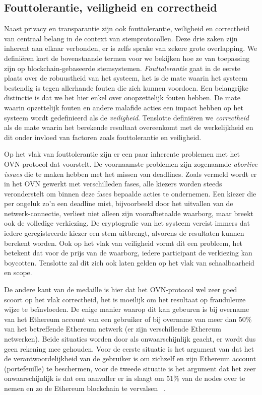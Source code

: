 	\subsection{Fouttolerantie, veiligheid en correctheid}
	
	Naast privacy en transparantie zijn ook fouttolerantie, veiligheid en correctheid van centraal belang in de context van stemprotocollen. Deze drie zaken zijn inherent aan elkaar verbonden, er is zelfs sprake van zekere grote overlapping. We definiëren kort de bovenstaande termen voor we bekijken hoe ze van toepassing zijn op blockchain-gebaseerde stemsystemen. \textit{Fouttolerantie} gaat in de eerste plaats over de robuustheid  van het systeem, het is de mate waarin het systeem bestendig is tegen allerhande fouten die zich kunnen voordoen. Een belangrijke distinctie is dat we het hier enkel over onopzettelijk fouten hebben. De mate waarin opzettelijk fouten en andere malafide acties een impact hebben op het systeem wordt gedefinieerd als de \textit{veiligheid}. Tenslotte definiëren we \textit{correctheid} als de mate waarin het berekende resultaat overeenkomt met de werkelijkheid en dit onder invloed van factoren zoals fouttolerantie en veiligheid.
	
	Op het vlak van fouttolerantie zijn er een paar inherente problemen met het OVN-protocol dat \textcite{McCorry2017} voorstelt. De voornaamste problemen zijn zogenaamde \textit{abortive issues} die te maken hebben met het missen van deadlines. Zoals vermeld wordt er in het OVN gewerkt met verschilleden fases, alle kiezers worden steeds veronderstelt om binnen deze fases bepaalde acties te ondernemen. Een kiezer die per ongeluk zo'n een deadline mist, bijvoorbeeld door het uitvallen van de netwerk-connectie, verliest niet alleen zijn voorafbetaalde waarborg, maar breekt ook de volledige verkiezing. De cryptografie van het systeem vereist immers dat iedere geregistreerde kiezer een stem uitbrengt, alvorens de resultaten kunnen berekent worden. Ook op het vlak van veiligheid vormt dit een probleem, het betekent dat voor de prijs van de waarborg, iedere participant de verkiezing kan boycotten. Tenslotte zal dit zich ook laten gelden op het vlak van schaalbaarheid en scope. 
	
	De andere kant van de medaille is hier dat het OVN-protocol wel zeer goed scoort op het vlak correctheid, het is moeilijk om het resultaat op frauduleuze wijze te beïnvloeden. De enige manier waarop dit kan gebeuren is bij overname van het Ethereum account van een gebruiker of bij overname van meer dan 50\% van het betreffende Ethereum netwerk (er zijn verschillende Ethereum netwerken). Beide situaties worden door \textcite{McCorry2017} als onwaarschijnlijk geacht, er wordt dus geen rekening mee gehouden. Voor de eerste situatie is het argument van \textcite{McCorry2017} dat het de verantwoordelijkheid van de gebruiker is om zichzelf en zijn Ethereum account (portefeuille) te beschermen, voor de tweede situatie is het argument dat het zeer onwaarschijnlijk is dat een aanvaller er in slaagt om 51\% van de nodes over te nemen en zo de Ethereum blockchain te vervalsen ~\autocite{McCorry2017}.
	
